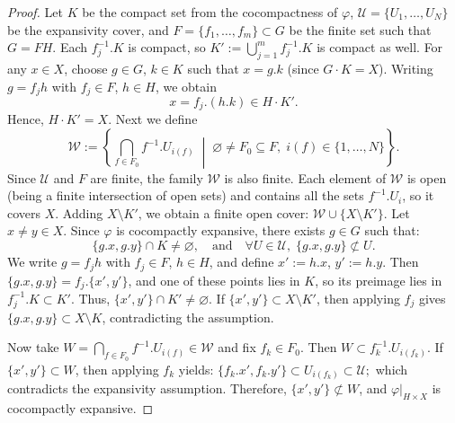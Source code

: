 \documentclass[10pt,a4paper]{amsart}
\begin{document}
\begin{proof}
Let \( K \) be the compact set from the cocompactness of \( \varphi \), \( \mathcal{U} = \{ U_1, \ldots, U_N \} \) be the expansivity cover, and \( F = \{ f_1, \ldots, f_m \} \subset G \) be the finite set such that \( G = F H \).
Each \( f_j^{-1}.K \) is compact, so \( K' := \bigcup_{j=1}^m f_j^{-1}.K \) is compact as well.
For any \( x \in X \), choose \( g \in G \), \( k \in K \) such that \( x = g.k \) (since \( G \cdot K = X \)).
Writing \( g = f_j h \) with \( f_j \in F \), \( h \in H \), we obtain
\[
x = f_j.(h.k) \in H \cdot K'.
\]
Hence, \( H \cdot K' = X \).
Next we define
\[
\mathcal{W}
:= \left\{
  \bigcap_{f \in F_0} f^{-1}.U_{i(f)} \;\middle|\;
  \varnothing \ne F_0 \subseteq F,\;
  i(f) \in \{1, \ldots, N\}
\right\}.
\]
Since \( \mathcal{U} \) and \( F \) are finite, the family \( \mathcal{W} \) is also finite.
Each element of \( \mathcal{W} \) is open (being a finite intersection of open sets) and contains all the sets \( f^{-1}.U_i \), so it covers \( X \).
Adding \( X \setminus K' \), we obtain a finite open cover:
$
\mathcal{W} \cup \{ X \setminus K' \}.
$
Let \( x \ne y \in X \). Since \( \varphi \) is cocompactly expansive, there exists \( g \in G \) such that:
\[
\{ g.x, g.y \} \cap K \ne \varnothing,
\quad \text{and} \quad
\forall U \in \mathcal{U},\;
\{ g.x, g.y \} \not\subset U.
\]
We write \( g = f_j h \) with \( f_j \in F \), \( h \in H \), and define \( x' := h.x \), \( y' := h.y \).
Then \( \{ g.x, g.y \} = f_j.\{ x', y' \} \), and one of these points lies in \( K \), so its preimage lies in \( f_j^{-1}.K \subset K' \).
Thus,
$
\{ x', y' \} \cap K' \ne \varnothing.
$
If \( \{ x', y' \} \subset X \setminus K' \), then applying \( f_j \) gives
\( \{ g.x, g.y \} \subset X \setminus K \), contradicting the assumption.

Now take \( W = \bigcap_{f \in F_0} f^{-1}.U_{i(f)} \in \mathcal{W} \) and fix \( f_k \in F_0 \). Then \( W \subset f_k^{-1}.U_{i(f_k)} \).
If \( \{ x', y' \} \subset W \), then applying \( f_k \) yields:
$
\{ f_k.x', f_k.y' \} \subset U_{i(f_k)} \subset \mathcal{U};
$
which contradicts the expansivity assumption.
Therefore, \( \{ x', y' \} \not\subset W \), and \( \varphi|_{H \times X} \) is cocompactly expansive.
\end{proof}
\end{document}
